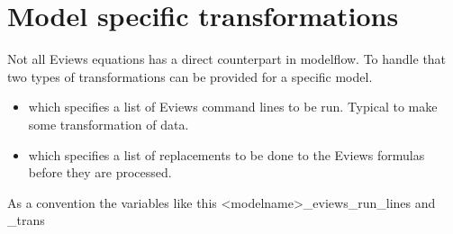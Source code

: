 \documentclass[letterpaper,10pt,english]{jupyterBook}
\begin{document}
\section{Model specific transformations}
\label{\detokenize{content/howto/onboard/eviews/onboard many models from wf1:model-specific-transformations}}
\sphinxAtStartPar
Not all Eviews equations has a direct counterpart in modelflow.
To handle that two types of transformations can be provided for a specific model.
\begin{itemize}
\item {} 
\sphinxAtStartPar
{} which specifies a list of Eviews command lines to be run. Typical to make some transformation of data.

\item {} 
\sphinxAtStartPar
{} which specifies a list of replacements to be done to the Eviews formulas before they are processed.

\end{itemize}

\sphinxAtStartPar
As a convention the variables like this <modelname>\_eviews\_run\_lines and \_trans
\end{document}
